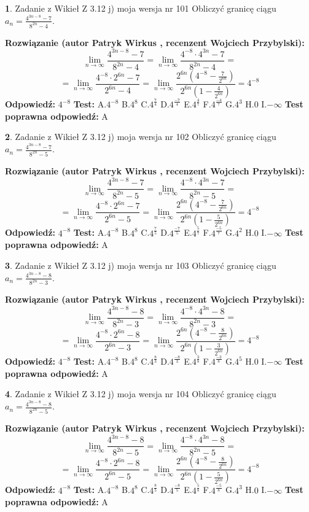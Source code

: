 \documentclass[12pt, a4paper]{article}
\theoremstyle{definition} %
\newtheorem{zad}{}
\newcommand{\zadStart}[1]{\begin{zad}#1\newline}
\newcommand{\zadStop}{\end{zad}}
\newcommand{\rozwStart}[2]{\noindent \textbf{Rozwiązanie (autor #1 , recenzent #2): }\newline}
\newcommand{\rozwStop}{\newline}
\newcommand{\odpStart}{\noindent \textbf{Odpowiedź:}\newline}
\newcommand{\odpStop}{\newline}
\newcommand{\testStart}{\noindent \textbf{Test:}\newline}
\newcommand{\testStop}{\newline}
\newcommand{\kluczStart}{\noindent \textbf{Test poprawna odpowiedź:}\newline}
\newcommand{\kluczStop}{\newline}
\begin{document}
\zadStart{Zadanie z Wikieł Z 3.12 j) moja wersja nr 101}
Obliczyć granicę ciągu $a_{n}=\frac{4^{3n-8}-7}{8^{2n}-4}$.
\zadStop
\rozwStart{Patryk Wirkus}{Wojciech Przybylski}
$$\lim\limits_{n\to\infty}\frac{4^{3n-8}-7}{8^{2n}-4}= \lim\limits_{n\to\infty}\frac{4^{-8} \cdot 4^{3n}-7}{8^{2n}-4}=$$
$$= \lim\limits_{n\to\infty}\frac{4^{-8} \cdot 2^{6n}-7}{2^{6n}-4}= \lim\limits_{n\to\infty}\frac{2^{6n}(4^{-8} - \frac{7}{2^{6n}})}{2^{6n}(1-\frac{4}{2^{6n}})}= 4^{-8}$$
\rozwStop
\odpStart
$4^{-8}$
\odpStop
\testStart
A.$4^{-8}$
B.$4^{8}$
C.$4^{\frac{7}{4}}$
D.$4^{\frac{-7}{4}}$
E.$4^{\frac{4}{7}}$
F.$4^{\frac{-4}{7}}$
G.$4^{3}$
H.$0$
I.$-\infty$
\testStop
\kluczStart
A
\kluczStop



\zadStart{Zadanie z Wikieł Z 3.12 j) moja wersja nr 102}
Obliczyć granicę ciągu $a_{n}=\frac{4^{3n-8}-7}{8^{2n}-5}$.
\zadStop
\rozwStart{Patryk Wirkus}{Wojciech Przybylski}
$$\lim\limits_{n\to\infty}\frac{4^{3n-8}-7}{8^{2n}-5}= \lim\limits_{n\to\infty}\frac{4^{-8} \cdot 4^{3n}-7}{8^{2n}-5}=$$
$$= \lim\limits_{n\to\infty}\frac{4^{-8} \cdot 2^{6n}-7}{2^{6n}-5}= \lim\limits_{n\to\infty}\frac{2^{6n}(4^{-8} - \frac{7}{2^{6n}})}{2^{6n}(1-\frac{5}{2^{6n}})}= 4^{-8}$$
\rozwStop
\odpStart
$4^{-8}$
\odpStop
\testStart
A.$4^{-8}$
B.$4^{8}$
C.$4^{\frac{7}{5}}$
D.$4^{\frac{-7}{5}}$
E.$4^{\frac{5}{7}}$
F.$4^{\frac{-5}{7}}$
G.$4^{2}$
H.$0$
I.$-\infty$
\testStop
\kluczStart
A
\kluczStop



\zadStart{Zadanie z Wikieł Z 3.12 j) moja wersja nr 103}
Obliczyć granicę ciągu $a_{n}=\frac{4^{3n-8}-8}{8^{2n}-3}$.
\zadStop
\rozwStart{Patryk Wirkus}{Wojciech Przybylski}
$$\lim\limits_{n\to\infty}\frac{4^{3n-8}-8}{8^{2n}-3}= \lim\limits_{n\to\infty}\frac{4^{-8} \cdot 4^{3n}-8}{8^{2n}-3}=$$
$$= \lim\limits_{n\to\infty}\frac{4^{-8} \cdot 2^{6n}-8}{2^{6n}-3}= \lim\limits_{n\to\infty}\frac{2^{6n}(4^{-8} - \frac{8}{2^{6n}})}{2^{6n}(1-\frac{3}{2^{6n}})}= 4^{-8}$$
\rozwStop
\odpStart
$4^{-8}$
\odpStop
\testStart
A.$4^{-8}$
B.$4^{8}$
C.$4^{\frac{8}{3}}$
D.$4^{\frac{-8}{3}}$
E.$4^{\frac{3}{8}}$
F.$4^{\frac{-3}{8}}$
G.$4^{5}$
H.$0$
I.$-\infty$
\testStop
\kluczStart
A
\kluczStop



\zadStart{Zadanie z Wikieł Z 3.12 j) moja wersja nr 104}
Obliczyć granicę ciągu $a_{n}=\frac{4^{3n-8}-8}{8^{2n}-5}$.
\zadStop
\rozwStart{Patryk Wirkus}{Wojciech Przybylski}
$$\lim\limits_{n\to\infty}\frac{4^{3n-8}-8}{8^{2n}-5}= \lim\limits_{n\to\infty}\frac{4^{-8} \cdot 4^{3n}-8}{8^{2n}-5}=$$
$$= \lim\limits_{n\to\infty}\frac{4^{-8} \cdot 2^{6n}-8}{2^{6n}-5}= \lim\limits_{n\to\infty}\frac{2^{6n}(4^{-8} - \frac{8}{2^{6n}})}{2^{6n}(1-\frac{5}{2^{6n}})}= 4^{-8}$$
\rozwStop
\odpStart
$4^{-8}$
\odpStop
\testStart
A.$4^{-8}$
B.$4^{8}$
C.$4^{\frac{8}{5}}$
D.$4^{\frac{-8}{5}}$
E.$4^{\frac{5}{8}}$
F.$4^{\frac{-5}{8}}$
G.$4^{3}$
H.$0$
I.$-\infty$
\testStop
\kluczStart
A
\kluczStop
\end{document}
